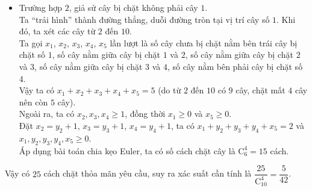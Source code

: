 \begin{ex}
{\begin{itemize}
Gọi $x_1$, $x_2$, $x_3$, $x_4$ lần lượt là số lượng cây nằm ở giữa bốn cây bị chặt (chưa bao gồm cây $2$ và cây $10$). \\
Vậy ta có $x_1+x_2+x_3+x_4=4$. Đồng thời $x_1\ge 0$, $x_2\ge 1$, $x_3\ge 1$ và $x_4\ge 0$ (do đã có cây $2$ và cây $10$ đứng cạnh cây $1$ bị chặt, nên $x_1$ và $x_4$ có thể bằng $0$ vẫn thỏa mãn yêu cầu đề bài). \\
Đặt $x_2=y_2+1$, $x_3=y_3+1$, suy ra $x_1+y_2+y_3+x_4=2$ và $x_1,  y_2, y_3, x_4\ge 0$. \\
Áp dụng bài toán chia kẹo Euler, ta có số cách chặt là $\mathrm{C}^3_5=10$ cách.
\item Trường hợp $2$, giả sử cây bị chặt không phải cây $1$. \\
Ta ``trải hình'' thành đường thẳng, duỗi đường tròn tại vị trí cây số $1$. Khi đó, ta xét các cây từ $2$ đến $10$. \\
Ta gọi $x_1$, $x_2$, $x_3$, $x_4$, $x_5$ lần lượt là số cây chưa bị chặt nằm bên trái cây bị chặt số $1$, số cây nằm giữa cây bị chặt $1$ và $2$, số cây nằm giữa cây bị chặt $2$ và $3$, số cây nằm giữa cây bị chặt $3$ và $4$, số cây nằm bên phải cây bị chặt số $4$. \\
Vậy ta có $x_1+x_2+x_3+x_4+x_5=5$ (do từ $2$ đến $10$ có $9$ cây, chặt mất $4$ cây nên còn $5$ cây). \\
Ngoài ra, ta có $x_2, x_3, x_4\ge 1$, đồng thời $x_1\ge 0$ và $x_5\ge 0$. \\
Đặt $x_2=y_2+1$, $x_3=y_3+1$, $x_4=y_4+1$, ta có $x_1+y_2+y_3+y_4+x_5=2$ và $x_1,y_2,y_3,y_4,x_5\ge 0$. \\
Áp dụng bài toán chia kẹo Euler, ta có số cách chặt cây là $\mathrm{C}^4_6=15$ cách.
\end{itemize}
Vậy có $25$ cách chặt thỏa mãn yêu cầu, suy ra xác suất cần tính là $\dfrac{25}{\mathrm{C}^4_{10}}=\dfrac{5}{42}$.
}
\end{ex}
